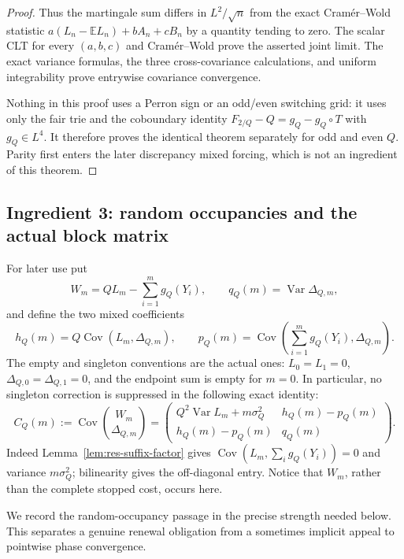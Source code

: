 \documentclass[11pt]{article}
\numberwithin{equation}{section}
\newcommand{\1}{\mathbf 1}\newcommand{\F}{\mathcal F}\newcommand{\D}{\mathcal D}
\begin{document}
\begin{proof}
Thus the martingale sum differs in $L^2/\sqrt n$ from the exact
Cram\'er--Wold statistic
$a(L_n-\mathbb EL_n)+bA_n+cB_n$ by a quantity tending to zero.  The scalar
CLT for every $(a,b,c)$ and Cram\'er--Wold prove the asserted joint limit.
The exact variance formulas, the three cross-covariance calculations, and
uniform integrability prove entrywise covariance convergence.

Nothing in this proof uses a Perron sign or an odd/even switching grid: it
uses only the fair trie and the coboundary identity
$F_{2/Q}-Q=g_Q-g_Q\circ T$ with $g_Q\in L^4$.  It therefore proves the
identical theorem separately for odd and even $Q$.  Parity first enters the
later discrepancy mixed forcing, which is not an ingredient of this theorem.
\end{proof}

\subsection{Ingredient 3: random occupancies and the actual block matrix}
For later use put
\[
 W_m=QL_m-\sum_{i=1}^m g_Q(Y_i),\qquad
 q_Q(m)=\operatorname {Var}\Delta_{Q,m},
\]
and define the two mixed coefficients
\[
 h_Q(m)=Q\operatorname {Cov}(L_m,\Delta_{Q,m}),\qquad
 p_Q(m)=\operatorname {Cov}\!\left(\sum_{i=1}^m
 g_Q(Y_i),\Delta_{Q,m}\right).
\]
The empty and singleton conventions are the actual ones: $L_0=L_1=0$,
$\Delta_{Q,0}=\Delta_{Q,1}=0$, and the endpoint sum is empty for $m=0$.
In particular, no singleton correction is suppressed in the following exact
identity:
\begin{equation}
 C_Q(m):=\operatorname {Cov}\binom{W_m}{\Delta_{Q,m}}
 =\begin{pmatrix}
 Q^2\operatorname {Var}L_m+m\sigma_Q^2&h_Q(m)-p_Q(m)\\
 h_Q(m)-p_Q(m)&q_Q(m)
 \end{pmatrix}.                                      \label{eq:actual-block-matrix}
\end{equation}
Indeed Lemma~\ref{lem:res-suffix-factor} gives
$\operatorname {Cov}(L_m,\sum_i g_Q(Y_i))=0$ and variance
$m\sigma_Q^2$; bilinearity gives the off-diagonal entry.  Notice that
$W_m$, rather than the complete stopped cost, occurs here.

We record the random-occupancy passage in the precise strength needed below.
This separates a genuine renewal obligation from a sometimes implicit
appeal to pointwise phase convergence.
\end{document}
